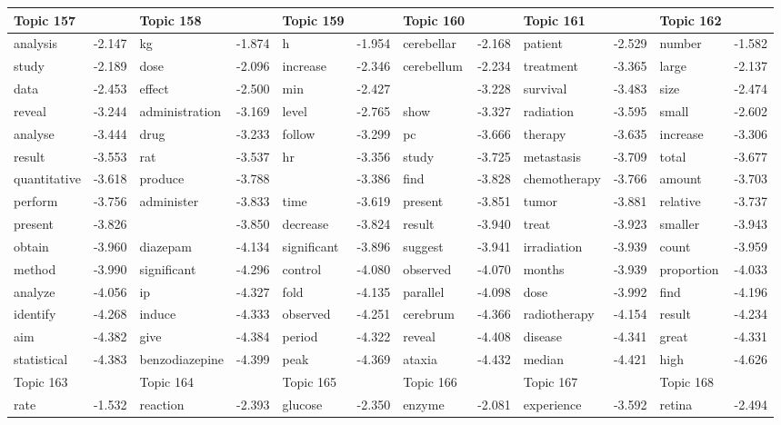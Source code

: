 \documentclass{article}
\begin{document}
\begin{table}
{\begin{tabular}{|l r|l r|l r|l r|l r|l r|}
\hline
Topic 157 & &Topic 158 & &Topic 159 & &Topic 160 & &Topic 161 & &Topic 162 &\\
\hline
analysis & -2.147 & kg & -1.874 & h & -1.954 & cerebellar & -2.168 & patient & -2.529 & number & -1.582\\
study & -2.189 & dose & -2.096 & increase & -2.346 & cerebellum & -2.234 & treatment & -3.365 & large & -2.137\\
data & -2.453 & effect & -2.500 & min & -2.427 &  & -3.228 & survival & -3.483 & size & -2.474\\
reveal & -3.244 & administration & -3.169 & level & -2.765 & show & -3.327 & radiation & -3.595 & small & -2.602\\
analyse & -3.444 & drug & -3.233 & follow & -3.299 & pc & -3.666 & therapy & -3.635 & increase & -3.306\\
result & -3.553 & rat & -3.537 & hr & -3.356 & study & -3.725 & metastasis & -3.709 & total & -3.677\\
quantitative & -3.618 & produce & -3.788 &  & -3.386 & find & -3.828 & chemotherapy & -3.766 & amount & -3.703\\
perform & -3.756 & administer & -3.833 & time & -3.619 & present & -3.851 & tumor & -3.881 & relative & -3.737\\
present & -3.826 &  & -3.850 & decrease & -3.824 & result & -3.940 & treat & -3.923 & smaller & -3.943\\
obtain & -3.960 & diazepam & -4.134 & significant & -3.896 & suggest & -3.941 & irradiation & -3.939 & count & -3.959\\
method & -3.990 & significant & -4.296 & control & -4.080 & observed & -4.070 & months & -3.939 & proportion & -4.033\\
analyze & -4.056 & ip & -4.327 & fold & -4.135 & parallel & -4.098 & dose & -3.992 & find & -4.196\\
identify & -4.268 & induce & -4.333 & observed & -4.251 & cerebrum & -4.366 & radiotherapy & -4.154 & result & -4.234\\
aim & -4.382 & give & -4.384 & period & -4.322 & reveal & -4.408 & disease & -4.341 & great & -4.331\\
statistical & -4.383 & benzodiazepine & -4.399 & peak & -4.369 & ataxia & -4.432 & median & -4.421 & high & -4.626\\
\hline
\hline
Topic 163 & &Topic 164 & &Topic 165 & &Topic 166 & &Topic 167 & &Topic 168 &\\
\hline
rate & -1.532 & reaction & -2.393 & glucose & -2.350 & enzyme & -2.081 & experience & -3.592 & retina & -2.494\\

\end{tabular}}
\end{table}
\end{document}
